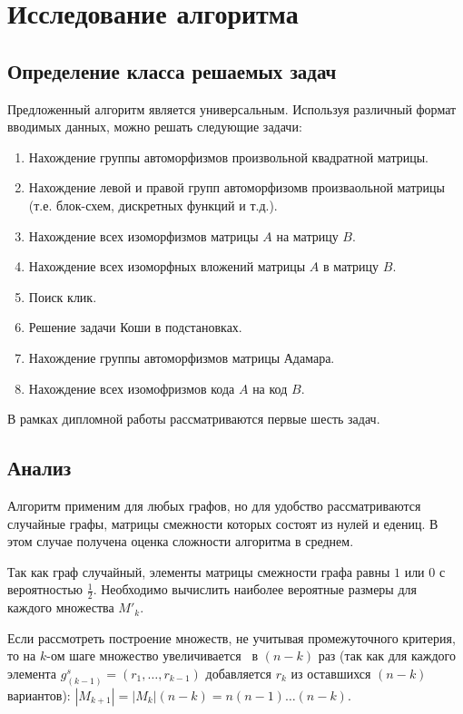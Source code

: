 \section{Исследование алгоритма}
\label{sec:AlgoResearch_4} 
\large


\subsection{Определение класса решаемых задач}
Предложенный алгоритм является универсальным. Используя различный формат вводимых данных, можно решать следующие задачи:
\begin{enumerate}
\item Нахождение группы автоморфизмов произвольной квадратной матрицы.
\item Нахождение левой и правой групп автоморфизомв произваольной матрицы (т.е. блок-схем, дискретных функций и т.д.).
\item Нахождение всех изоморфизмов матрицы $A$ на матрицу $B$.
\item Нахождение всех изоморфных вложений матрицы $A$ в матрицу $B$.
\item Поиск клик.
\item Решение задачи Коши в подстановках.
\item Нахождение группы автоморфизмов матрицы Адамара.
\item Нахождение всех изомофризмов кода $A$ на код $B$.
\end{enumerate}

В рамках дипломной работы рассматриваются первые шесть задач.

\subsection{Анализ}

Алгоритм применим для любых графов, но для удобство рассматриваются случайные графы, матрицы смежности которых состоят из нулей и едениц.
В этом случае получена оценка сложности алгоритма в среднем.

Так как граф случайный, элементы матрицы смежности графа равны $1$ или $0$ с вероятностью $\frac{1}{2}$. Необходимо вычислить наиболее вероятные размеры для каждого множества $M'_k$.

Если рассмотреть построение множеств, не учитывая промежуточного критерия, то на $k$-ом шаге множество увеличивается \ в $(n-k)$ раз (так как для каждого элемента $g^s_{(k-1)} = (r_1, \ldots, r_{k-1})$ добавляется $r_k$ из оставшихся $(n-k)$ вариантов): $|M_{k+1}| = |M_{k}|(n-k)= n(n-1)\ldots(n-k)$.

